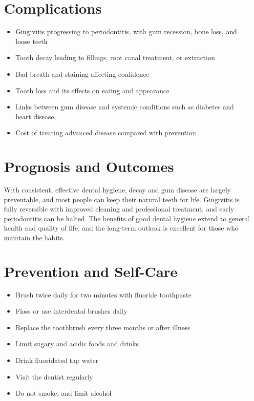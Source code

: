 \section*{Complications}
\begin{itemize}
    \item Gingivitis progressing to periodontitis, with gum recession, bone loss, and loose teeth
    \item Tooth decay leading to fillings, root canal treatment, or extraction
    \item Bad breath and staining affecting confidence
    \item Tooth loss and its effects on eating and appearance
    \item Links between gum disease and systemic conditions such as diabetes and heart disease
    \item Cost of treating advanced disease compared with prevention
\end{itemize}

\section*{Prognosis and Outcomes}
With consistent, effective dental hygiene, decay and gum disease are largely preventable, and most people can keep their natural teeth for life. Gingivitis is fully reversible with improved cleaning and professional treatment, and early periodontitis can be halted. The benefits of good dental hygiene extend to general health and quality of life, and the long-term outlook is excellent for those who maintain the habits.

\section*{Prevention and Self-Care}
\begin{itemize}
    \item Brush twice daily for two minutes with fluoride toothpaste
    \item Floss or use interdental brushes daily
    \item Replace the toothbrush every three months or after illness
    \item Limit sugary and acidic foods and drinks
    \item Drink fluoridated tap water
    \item Visit the dentist regularly
    \item Do not smoke, and limit alcohol
\end{itemize}

